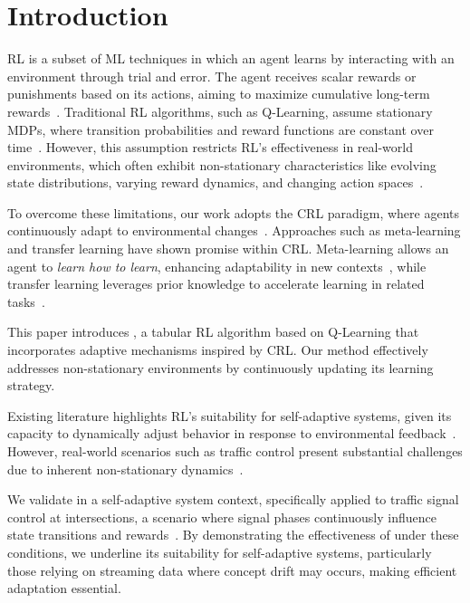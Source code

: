 
\section{Introduction}
\label{sec:introduction}

\acf{RL} is a subset of \ac{ML} techniques in which an agent learns by interacting with an environment through trial and error. The agent receives scalar rewards or punishments based on its actions, aiming to maximize cumulative long-term rewards~\cite{sutton98}. Traditional RL algorithms, such as Q-Learning, assume stationary \acp{MDP}, where transition probabilities and reward functions are constant over time~\cite{meta-rl-traffic}. However, this assumption restricts RL's effectiveness in real-world environments, which often exhibit non-stationary characteristics like evolving state distributions, varying reward dynamics, and changing action spaces~\cite{khetarpal2022continualreinforcementlearningreview}.

To overcome these limitations, our work adopts the \acf{CRL} paradigm, where agents continuously adapt to environmental changes~\cite{abel2023definitioncontinualreinforcementlearning}. Approaches such as meta-learning and transfer learning have shown promise within \ac{CRL}. Meta-learning allows an agent to \emph{learn how to learn}, enhancing adaptability in new contexts~\cite{beck2024surveymetareinforcementlearning}, while transfer learning leverages prior knowledge to accelerate learning in related tasks~\cite{chen2022transferredqlearning}.

This paper introduces \adaptiverl, a tabular RL algorithm based on Q-Learning that incorporates adaptive mechanisms inspired by \ac{CRL}. Our method effectively addresses non-stationary environments by continuously updating its learning strategy. 

Existing literature highlights RL's suitability for self-adaptive systems, given its capacity to dynamically adjust behavior in response to environmental feedback~\cite{HENRICHS2022106940}. However, real-world scenarios such as traffic control present substantial challenges due to inherent non-stationary dynamics~\cite{meta-rl-traffic}.

We validate \adaptiverl in a self-adaptive system context, specifically applied to traffic signal control at intersections, a scenario where signal phases continuously influence state transitions and rewards~\cite{meta-rl-traffic}. By demonstrating the effectiveness of \adaptiverl under these conditions, we underline its suitability for self-adaptive systems, particularly those relying on streaming data where concept drift may occurs, making efficient adaptation essential.

